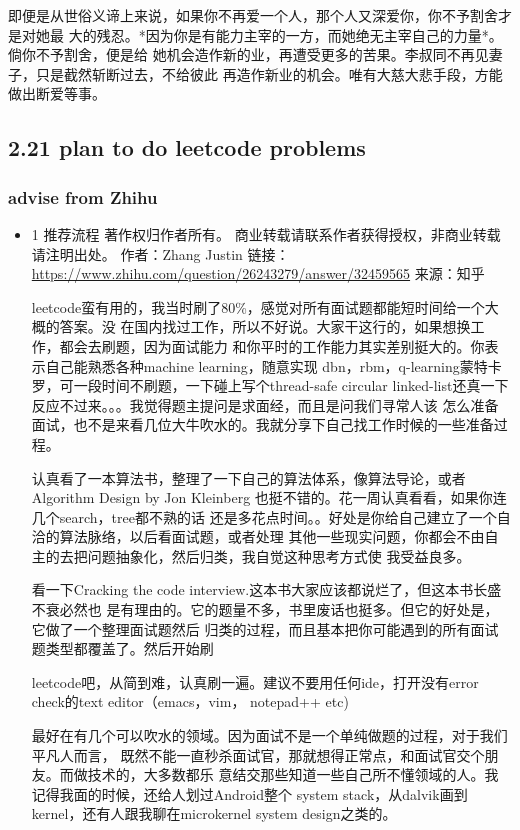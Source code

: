 \documentclass[11pt]{article}
\begin{document}
即便是从世俗义谛上来说，如果你不再爱一个人，那个人又深爱你，你不予割舍才是对她最
大的残忍。*因为你是有能力主宰的一方，而她绝无主宰自己的力量*。倘你不予割舍，便是给
她机会造作新的业，再遭受更多的苦果。李叔同不再见妻子，只是截然斩断过去，不给彼此
再造作新业的机会。唯有大慈大悲手段，方能做出断爱等事。
\subsection*{2.21 plan to do leetcode problems}
\label{sec:orgheadline111}
\subsubsection*{advise from Zhihu}
\label{sec:orgheadline110}
\begin{itemize}
\item 1 推荐流程
\label{sec:orgheadline108}
著作权归作者所有。
商业转载请联系作者获得授权，非商业转载请注明出处。
作者：Zhang Justin
链接：\url{https://www.zhihu.com/question/26243279/answer/32459565}
来源：知乎

leetcode蛮有用的，我当时刷了80\%，感觉对所有面试题都能短时间给一个大概的答案。没
在国内找过工作，所以不好说。大家干这行的，如果想换工作，都会去刷题，因为面试能力
和你平时的工作能力其实差别挺大的。你表示自己能熟悉各种machine learning，随意实现
dbn，rbm，q-learning蒙特卡罗，可一段时间不刷题，一下碰上写个thread-safe circular
linked-list还真一下反应不过来。。。我觉得题主提问是求面经，而且是问我们寻常人该
怎么准备面试，也不是来看几位大牛吹水的。我就分享下自己找工作时候的一些准备过程。

认真看了一本算法书，整理了一下自己的算法体系，像算法导论，或者Algorithm Design
by Jon Kleinberg 也挺不错的。花一周认真看看，如果你连几个search，tree都不熟的话
还是多花点时间。。好处是你给自己建立了一个自洽的算法脉络，以后看面试题，或者处理
其他一些现实问题，你都会不由自主的去把问题抽象化，然后归类，我自觉这种思考方式使
我受益良多。

看一下Cracking the code interview.这本书大家应该都说烂了，但这本书长盛不衰必然也
是有理由的。它的题量不多，书里废话也挺多。但它的好处是，它做了一个整理面试题然后
归类的过程，而且基本把你可能遇到的所有面试题类型都覆盖了。然后开始刷

leetcode吧，从简到难，认真刷一遍。建议不要用任何ide，打开没有error check的text
editor（emacs，vim， notepad++ etc)


 最好在有几个可以吹水的领域。因为面试不是一个单纯做题的过程，对于我们平凡人而言，
既然不能一直秒杀面试官，那就想得正常点，和面试官交个朋友。而做技术的，大多数都乐
意结交那些知道一些自己所不懂领域的人。我记得我面的时候，还给人划过Android整个
system stack，从dalvik画到kernel，还有人跟我聊在microkernel system design之类的。


\end{itemize}
\end{document}
